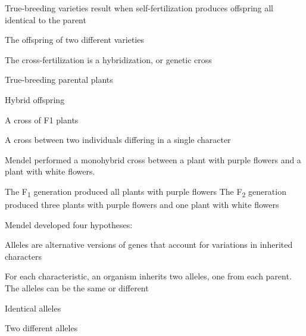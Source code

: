 \newcommand{\truebreedingdef}{True-breeding varieties result when self-fertilization produces offspring all identical to the parent}
\begin{definition} \label{definition:truebreeding}
    \truebreedingdef
\end{definition}
\newcommand{\hybriddef}{The offspring of two different varieties}
\begin{definition}[Hybrid] \label{definition:hybrid}
    \hybriddef

    The cross-fertilization is a hybridization, or genetic cross
\end{definition}
\newcommand{\pgendef}{True-breeding parental plants}
\begin{definition}[P generation] \label{definition:pgen}
    \pgendef
\end{definition}

\newcommand{\fodef}{Hybrid offspring}
\begin{definition}[F\textsubscript{1}] \label{definition:F1}
    \fodef
\end{definition}
\newcommand{\ftdef}{A cross of F1 plants}
\begin{definition}[F\textsubscript{2}] \label{definition:f2}
    \ftdef
\end{definition}

\newcommand{\monohybriddef}{A cross between two individuals differing in a single character}
\begin{definition} \label{definition:monohybrid}
    \monohybriddef
    
    Mendel performed a monohybrid cross between a plant with purple flowers and a plant with white flowers.

    The F\textsubscript{1} generation produced all plants with purple flowers
    The F\textsubscript{2} generation produced three plants with purple flowers and one plant with white flowers
\end{definition}

Mendel developed four hypotheses:
\newcommand{\alelesdef}{Alleles are alternative versions of genes that account for variations in inherited characters}
\begin{definition}[Alleles] \label{definition:aleles}
    \alelesdef
\end{definition}

For each characteristic, an organism inherits two alleles, one from each parent. The alleles can be the same or different
\newcommand{\homozygousdef}{Identical alleles}
\begin{definition} \label{definition:homozygous}
    \homozygousdef
\end{definition}
\newcommand{\heterozygousdef}{Two different alleles}
\begin{definition} \label{definition:heterozygous}
    \heterozygousdef
\end{definition}


